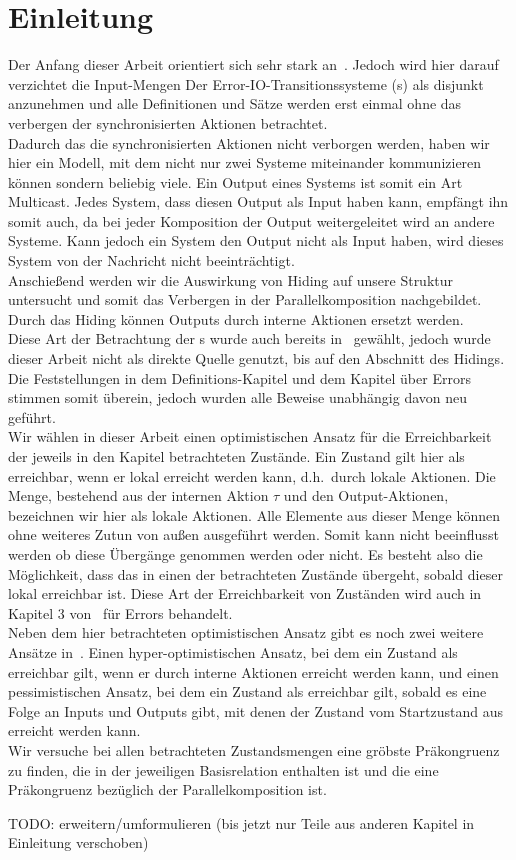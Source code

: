 \chapter{Einleitung}

Der Anfang dieser Arbeit orientiert sich sehr stark an~\cite{Vogler2014EIO}.
Jedoch wird hier darauf verzichtet die Input-Mengen Der
Error-IO-Transitionssysteme (\EIO{}s) als disjunkt anzunehmen und alle
Definitionen und Sätze werden erst einmal ohne das verbergen der
synchronisierten Aktionen betrachtet.\\
Dadurch das die synchronisierten Aktionen nicht verborgen werden, haben wir hier
ein Modell, mit dem nicht nur zwei Systeme miteinander kommunizieren können
sondern beliebig viele. Ein Output eines Systems ist somit ein Art Multicast.
Jedes System, dass diesen Output als Input haben kann, empfängt ihn somit auch,
da bei jeder Komposition der Output weitergeleitet wird an andere Systeme.
Kann jedoch ein System den Output nicht als Input haben, wird dieses System von
der Nachricht nicht beeinträchtigt.\\
Anschießend werden wir die Auswirkung von Hiding auf unsere Struktur
untersucht und somit das Verbergen in der Parallelkomposition nachgebildet.
Durch das Hiding können Outputs durch interne Aktionen ersetzt werden.\\
Diese Art der Betrachtung der
\EIO{}s wurde auch bereits in~\cite{Schlosser2012BA} gewählt, jedoch wurde
dieser Arbeit nicht als direkte Quelle genutzt, bis auf den Abschnitt des
Hidings. Die Feststellungen in dem Definitions-Kapitel und dem Kapitel über
Errors stimmen somit überein, jedoch wurden alle Beweise unabhängig davon neu
geführt.\\
Wir wählen in dieser Arbeit einen optimistischen Ansatz für die Erreichbarkeit
der jeweils in den Kapitel betrachteten Zustände. Ein Zustand gilt hier als erreichbar, wenn
er lokal erreicht werden kann, d.h.\ durch lokale Aktionen. Die Menge,
bestehend aus der internen Aktion $\tau$ und den Output-Aktionen, bezeichnen wir
hier als lokale Aktionen. Alle Elemente aus dieser Menge können ohne weiteres
Zutun von außen ausgeführt werden. Somit kann nicht beeinflusst werden ob diese
Übergänge genommen werden oder nicht. Es besteht also die Möglichkeit, dass das
\EIO{} in einen der betrachteten Zustände übergeht, sobald dieser lokal
erreichbar ist. Diese Art der Erreichbarkeit von Zuständen wird auch in Kapitel
3 von~\cite{Vogler2014EIO} für Errors behandelt.\\
Neben dem hier betrachteten optimistischen Ansatz gibt es noch zwei weitere
Ansätze in~\cite{Vogler2014EIO}. Einen hyper-optimistischen Ansatz, bei dem ein
Zustand als erreichbar gilt, wenn er durch interne Aktionen erreicht werden
kann, und einen pessimistischen Ansatz, bei dem ein Zustand als erreichbar gilt,
sobald es eine Folge an Inputs und Outputs gibt, mit denen der Zustand vom
Startzustand aus erreicht werden kann.\\
Wir versuche bei allen betrachteten Zustandsmengen eine gröbste Präkongruenz zu
finden, die in der jeweiligen Basisrelation enthalten ist und die eine
Präkongruenz bezüglich der Parallelkomposition ist.

\scriptsize\textcolor{lgray}{TODO: erweitern/umformulieren (bis jetzt nur Teile
aus anderen Kapitel in Einleitung verschoben)}

\normalsize
